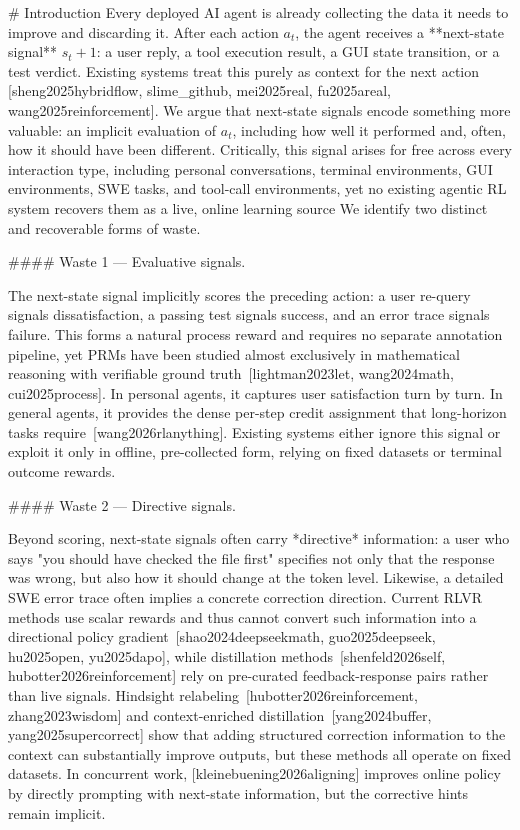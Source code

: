 # Introduction
Every deployed AI agent is already collecting the data it needs to improve and discarding it. After each action $a_t$, the agent receives a **next-state signal** $s_t+1$: a user reply, a tool execution result, a GUI state transition, or a test verdict. Existing systems treat this purely as context for the next action [sheng2025hybridflow, slime_github, mei2025real, fu2025areal, wang2025reinforcement]. We argue that next-state signals encode something more valuable: an implicit evaluation of $a_t$, including how well it performed and, often, how it should have been different. Critically, this signal arises for free across every interaction type, including personal conversations, terminal environments, GUI environments, SWE tasks, and tool-call environments, yet no existing agentic RL system recovers them as a live, online learning source We identify two distinct and recoverable forms of waste.

#### Waste 1 --- Evaluative signals.

The next-state signal implicitly scores the preceding action: a user re-query signals dissatisfaction, a passing test signals success, and an error trace signals failure. This forms a natural process reward and requires no separate annotation pipeline, yet PRMs have been studied almost exclusively in mathematical reasoning with verifiable ground truth [lightman2023let, wang2024math, cui2025process]. In personal agents, it captures user satisfaction turn by turn. In general agents, it provides the dense per-step credit assignment that long-horizon tasks require [wang2026rlanything]. Existing systems either ignore this signal or exploit it only in offline, pre-collected form, relying on fixed datasets or terminal outcome rewards.

#### Waste 2 --- Directive signals.

Beyond scoring, next-state signals often carry *directive* information: a user who says "you should have checked the file first" specifies not only that the response was wrong, but also how it should change at the token level. Likewise, a detailed SWE error trace often implies a concrete correction direction. Current RLVR methods use scalar rewards and thus cannot convert such information into a directional policy gradient [shao2024deepseekmath, guo2025deepseek, hu2025open, yu2025dapo], while distillation methods [shenfeld2026self, hubotter2026reinforcement] rely on pre-curated feedback-response pairs rather than live signals. Hindsight relabeling [hubotter2026reinforcement, zhang2023wisdom] and context-enriched distillation [yang2024buffer, yang2025supercorrect] show that adding structured correction information to the context can substantially improve outputs, but these methods all operate on fixed datasets. In concurrent work, [kleinebuening2026aligning] improves online policy by directly prompting with next-state information, but the corrective hints remain implicit.

